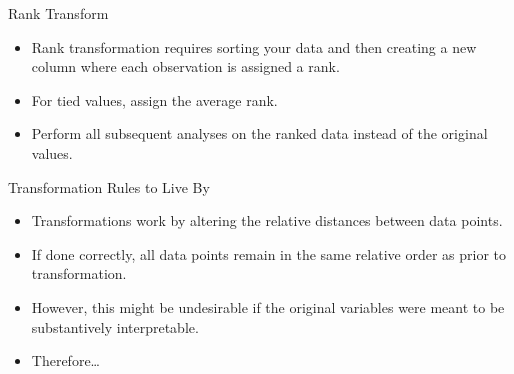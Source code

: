 \documentclass[
  ignorenonframetext,
]{beamer}
\providecommand{\tightlist}{%
  \setlength{\itemsep}{0pt}\setlength{\parskip}{0pt}}
\begin{document}
\begin{frame}{Rank Transform}
\label{rank-transform}
\begin{itemize}
\tightlist
\item
  Rank transformation requires sorting your data and then creating a new
  column where each observation is assigned a rank.
\end{itemize}

\begin{itemize}
\tightlist
\item
  For tied values, assign the average rank.
\item
  Perform all subsequent analyses on the ranked data instead of the
  original values.
\end{itemize}
\end{frame}

\begin{frame}{Transformation Rules to Live By}
\label{transformation-rules-to-live-by}
\begin{itemize}
\item
  Transformations work by altering the relative distances between data
  points.
\item
  If done correctly, all data points remain in the same relative order
  as prior to transformation.
\item
  However, this might be undesirable if the original variables were
  meant to be substantively interpretable.
\item
  Therefore\ldots{}
\end{itemize}
\end{frame}
\end{document}
